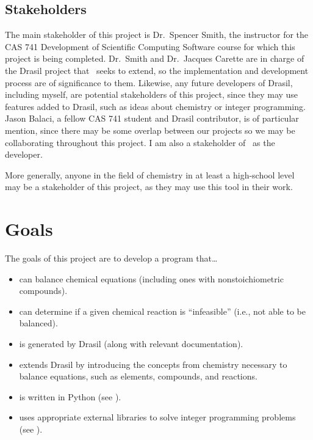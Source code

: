 \documentclass{article}
\begin{document}
\subsection{Stakeholders} \label{stkhlds}
The main stakeholder of this project is Dr.~Spencer Smith, the instructor for
the CAS 741 Development of Scientific Computing Software course for which this
project is being completed. Dr.~Smith and Dr.~Jacques Carette are in charge of
the Drasil project that \progname~seeks to extend, so the implementation and
development process are of significance to them. Likewise, any future
developers of Drasil, including myself, are
potential stakeholders of this project, since they may use features added to
Drasil, such as ideas about chemistry or integer programming. Jason
Balaci, a fellow CAS 741 student and Drasil contributor, is of particular
mention, since
there may be some overlap between our projects so we may be collaborating
throughout this project. I am also a stakeholder of \progname~as the
developer.

More generally, anyone in the field of chemistry in at least a high-school level
may be a stakeholder of this project, as they may use this tool in their work.

\section{Goals}

The goals of this project are to develop a program that\dots

\begin{itemize}
	\item can balance chemical equations (including ones with nonstoichiometric
	      compounds).
	\item can determine if a given chemical reaction is ``infeasible'' (i.e.,
	      not able to be balanced).
	\item is generated by Drasil (along with relevant documentation).
	\item extends Drasil by introducing the concepts from chemistry necessary
	      to balance equations, such as elements, compounds, and reactions.
	\item is written in Python (see ).
	\item uses appropriate external libraries to solve integer programming
	      problems (see \cite[Ch. 4]{chen_solving_2022}).
\end{itemize}

\newpage
\end{document}
